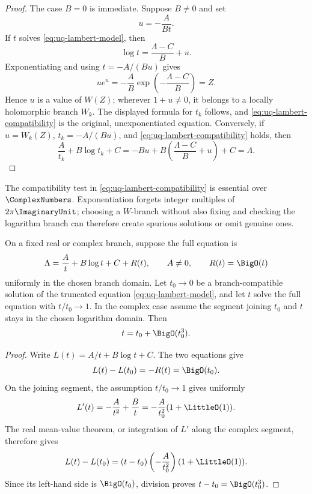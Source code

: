 \begin{proof}
The case \(B=0\) is immediate.  Suppose \(B\ne0\) and set
\[
 u=-\frac{A}{Bt}.
\]
If \(t\) solves \eqref{eq:uq-lambert-model}, then
\[
 \log t=\frac{\Lambda-C}{B}+u.
\]
Exponentiating and using \(t=-A/(Bu)\) gives
\[
 ue^u=-\frac AB\exp\!\left(-\frac{\Lambda-C}{B}\right)=Z.
\]
Hence \(u\) is a value of \(W(Z)\); wherever \(1+u\ne0\), it belongs to a
locally holomorphic branch \(W_k\).  The displayed formula for \(t_k\) follows,
and
\eqref{eq:uq-lambert-compatibility} is the original, unexponentiated
equation.  Conversely, if \(u=W_k(Z)\), \(t_k=-A/(Bu)\), and
\eqref{eq:uq-lambert-compatibility} holds, then
\[
 \frac{A}{t_k}+B\log t_k+C
 =-Bu+B\left(\frac{\Lambda-C}{B}+u\right)+C
 =\Lambda.
\]
\end{proof}

\begin{warning}
The compatibility test in
\eqref{eq:uq-lambert-compatibility} is essential over \(\ComplexNumbers\).
Exponentiation forgets integer multiples of \(2\pi\ImaginaryUnit\); choosing a
\(W\)-branch without also fixing and checking the logarithm branch can
therefore create spurious solutions or omit genuine ones.
\end{warning}

\begin{corollary}
\label{cor:uq-lambert-preconditioner-error}
On a fixed real or complex branch, suppose the full equation is
\[
 \Lambda=\frac At+B\log t+C+R(t),
 \qquad A\ne0,\qquad R(t)=\BigO(t)
\]
uniformly in the chosen branch domain.  Let \(t_0\to0\) be a
branch-compatible solution of the truncated equation
\eqref{eq:uq-lambert-model}, and let \(t\) solve the full equation with
\(t/t_0\to1\).  In the complex case assume the segment joining \(t_0\) and
\(t\) stays in the chosen logarithm domain.  Then
\[
 t=t_0+\BigO(t_0^3).
\]
\end{corollary}

\begin{proof}
Write \(L(t)=A/t+B\log t+C\).  The two equations give
\[
 L(t)-L(t_0)=-R(t)=\BigO(t_0).
\]
On the joining segment, the assumption \(t/t_0\to1\) gives uniformly
\[
 L'(t)=-\frac{A}{t^2}+\frac Bt
 =-\frac{A}{t_0^2}(1+\LittleO(1)).
\]
The real mean-value theorem, or integration of \(L'\) along the complex
segment, therefore gives
\[
 L(t)-L(t_0)
 =(t-t_0)\left(-\frac{A}{t_0^2}\right)(1+\LittleO(1)).
\]
Since its left-hand side is \(\BigO(t_0)\), division proves
\(t-t_0=\BigO(t_0^3)\).
\end{proof}

